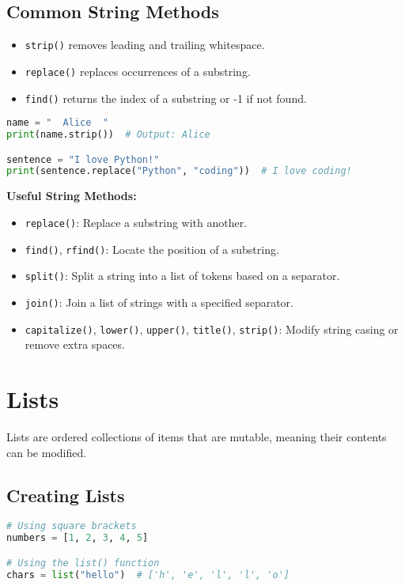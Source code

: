 \documentclass{article}
\begin{document}
\subsection{Common String Methods}
\begin{itemize}
    \item \texttt{strip()} removes leading and trailing whitespace.
    \item \texttt{replace()} replaces occurrences of a substring.
    \item \texttt{find()} returns the index of a substring or -1 if not found.
\end{itemize}
\begin{lstlisting}[language=Python]
name = "  Alice  "
print(name.strip())  # Output: Alice

sentence = "I love Python!"
print(sentence.replace("Python", "coding"))  # I love coding!
\end{lstlisting}
\noindent\textbf{Useful String Methods:}
\begin{itemize}
    \item \texttt{replace()}: Replace a substring with another.
    \item \texttt{find()}, \texttt{rfind()}: Locate the position of a substring.
    \item \texttt{split()}: Split a string into a list of tokens based on a separator.
    \item \texttt{join()}: Join a list of strings with a specified separator.
    \item \texttt{capitalize()}, \texttt{lower()}, \texttt{upper()}, \texttt{title()}, \texttt{strip()}: Modify string casing or remove extra spaces.
\end{itemize}
\newpage

\section{Lists}
Lists are ordered collections of items that are mutable, meaning their contents can be modified.

\subsection{Creating Lists}
\begin{lstlisting}[language=Python]
# Using square brackets
numbers = [1, 2, 3, 4, 5]

# Using the list() function
chars = list("hello")  # ['h', 'e', 'l', 'l', 'o']
\end{lstlisting}
\end{document}
